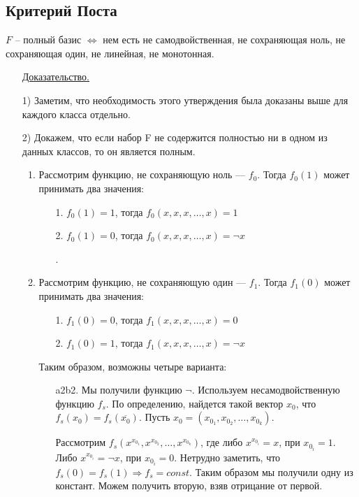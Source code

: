 \subsection{Критерий Поста}
$F$ --  полный базис $\Leftrightarrow$ нем есть не самодвойственная, не сохраняющая ноль, не сохраняющая один, не линейная, не монотонная.

\begin{enumerate}
\item[] \uline{Доказательство.}
\item[1)] Заметим, что необходимость этого утверждения была доказаны выше для каждого класса отдельно.

 \item[2)]Докажем, что если набор F не содержится полностью ни в одном из данных классов, то он является полным.

\begin{enumerate}
    \item  Рассмотрим функцию, не сохраняющую ноль --- $f_0$. Тогда $f_0(1)$ может принимать два значения:
     \begin{enumerate}
        \item[1.] $f_0(1)=1$, тогда $f_0(x,x,x,\ldots,x)=1$
        \item[2.] $f_0(1)=0$, тогда $f_0(x,x,x,\ldots,x)=\neg x$

.
    \end{enumerate}
    \item Рассмотрим функцию, не сохраняющую один — $f_1$. Тогда $f_1(0)$ может принимать два значения:
    \begin{enumerate}
        \item[1.]$f_1(0)=0$, тогда $f_1(x,x,x,\ldots,x)=0$
        \item[2.]$f_1(0)=1$, тогда $f_1(x,x,x,\ldots,x)=\neg x$
    \end{enumerate}
    Таким образом, возможны четыре варианта:
    \begin{enumerate}
        \item[a2b2.] Мы получили функцию $\neg$.
        Используем несамодвойственную функцию $f_s$. По определению, найдется такой вектор $x_0$, что $f_s(x_0)=f_s(\overline{x_0})$. Пусть $x_0=(x_{0_1},x_{0_2},\ldots,x_{0_k})$.
        
        Рассмотрим $f_s(x^{x_{0_1}},x^{x_{0_2}},\ldots,x^{x_{0_{k}}})$, где либо $x^{x_{0_i}}=x$, при $x_{0_i}=1$. Либо $x^{x_{0_i}}=\neg x$, при $x_{0_i}=0$. Нетрудно заметить, что $f_s(0)=f_s(1) \Rightarrow  f_s=const$. Таким образом мы получили одну из констант. Можем получить вторую, взяв отрицание от первой.


\end{enumerate}
\end{enumerate}
\end{enumerate}
